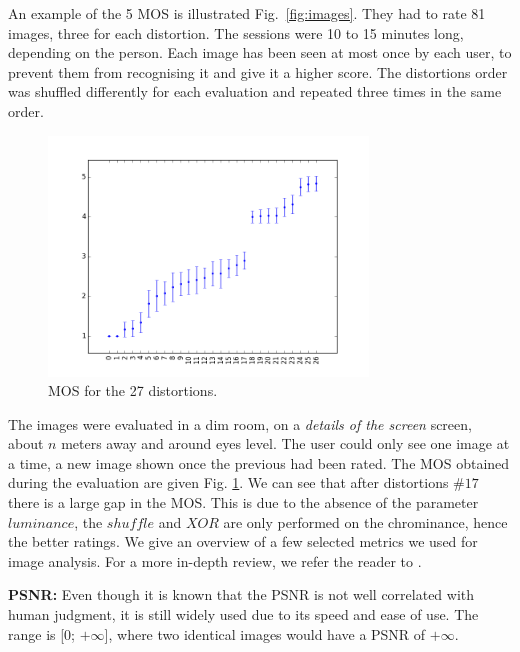 \documentclass{article}
\begin{document}
An example of the 5 MOS is illustrated Fig.~\ref{fig:images}. They had to rate 81 images, three for each distortion. The sessions were 10 to 15 minutes long, depending on the person. Each image has been seen at most once by each user, to prevent them from recognising it and give it a higher score. The distortions order was shuffled differently for each evaluation and repeated three times in the same order. %

\begin{figure}[H]
  \centering
  \includegraphics[width=8.5cm]{figures/mos}
  \vspace{-5mm}
  \caption{MOS for the 27 distortions.\label{fig:mos} }
\end{figure}

The images were evaluated in a dim room, on a \textit{details of the screen} screen, about $n$ meters away and around eyes level. The user could only see one image at a time, a new image shown once the previous had been rated.
The MOS obtained during the evaluation are given Fig. \ref{fig:mos}. %
We can see that after distortions $\#17$ there is a large gap in the MOS. This is due to the absence of the parameter $luminance$, the $shuffle$ and $XOR$ are only performed on the chrominance, hence the better ratings.
We give an overview of a few selected metrics we used for image analysis. For a more in-depth review, we refer the reader to \cite{hofbauer2016identifying}.

\textbf{PSNR:} Even though it is known that the PSNR is not well correlated with human judgment, it is still widely used due to its speed and ease of use. The range is [0; $+\infty$], where two identical images would have a PSNR of $+\infty$.
\end{document}
